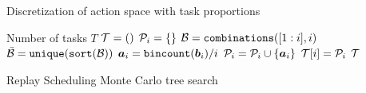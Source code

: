 \begin{algorithm}[h!]
	\scriptsize %
	\caption{Discretization of action space with task proportions}
	\label{paperC:alg:action_space_discretization}
	\begin{algorithmic}[1]
		\Require Number of tasks $T$
		\State ${\mathcal{T}} = ()$ 
		\State ${\mathcal{P}}_i = \{\}$ 
		\State ${\mathcal{B}} = \texttt{combinations}([1:i], i)$ 
		\State $\bar{{\mathcal{B}}} = \texttt{unique}(\texttt{sort}({\mathcal{B}}))$ 
		\State ${\bm{a}}_i = \texttt{bincount}({\bm{b}}_i) / i$ 
		\State ${\mathcal{P}}_i = {\mathcal{P}}_i \cup \{ {\bm{a}}_i \}$ 
		\EndFor
		\State ${\mathcal{T}}[i] = {\mathcal{P}}_i$ 
		\EndFor
		\State \Return ${\mathcal{T}}$ 
	\end{algorithmic}

\end{algorithm}


\begin{algorithm}[h!]
	\caption{Replay Scheduling Monte Carlo tree search}
	\label{alg:replay_scheduling_mcts}
	\algrenewcommand{}
	\scriptsize
	
\end{algorithm}









